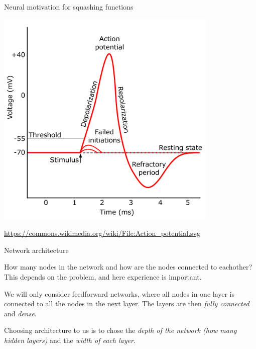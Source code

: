 \documentclass[10pt,ignorenonframetext,]{beamer}
\begin{document}
\begin{frame}

\begin{block}{Neural motivation for squashing functions}

\centering
\includegraphics[width=0.80000\textwidth]{Action_potential.png}

\url{https://commons.wikimedia.org/wiki/File:Action_potential.svg}

\end{block}

\end{frame}

\begin{frame}

\begin{block}{Network architecture}

How many nodes in the network and how are the nodes connected to
eachother? This depends on the problem, and here experience is
important.

We will only consider feedforward networks, where all nodes in one layer
is connected to all the nodes in the next layer. The layers are then
\emph{fully connected} and \emph{dense}.

Choosing architecture to us is to chose the \emph{depth of the network
(how many hidden layers)} and the \emph{width of each layer}.

\end{block}

\end{frame}
\end{document}
